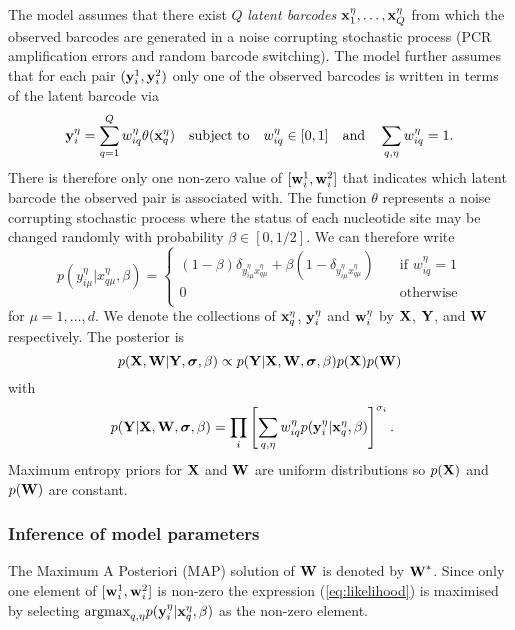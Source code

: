 The model assumes that there exist $Q$ \emph{latent barcodes} $\boldsymbol{\mathbf{x}}_1^{\eta},\ldots,\boldsymbol{\mathbf{x}}_Q^{\eta}$ from which the observed barcodes are generated in a noise corrupting stochastic process (PCR amplification errors and random barcode switching). The model further assumes that for each pair $(\boldsymbol{\mathbf{y}}_i^1,\boldsymbol{\mathbf{y}}_i^2)$ only one of the observed barcodes is written in terms of the latent barcode via
\begin{equation}
\boldsymbol{\mathbf{y}}_i^{\eta} = \sum_{q=1}^Q w_{iq}^{\eta}\theta(\boldsymbol{\mathbf{x}}_{q}^{\eta})\quad\text{subject to}\quad w_{iq}^{\eta}\in[0,1]\quad\text{and}\quad\sum_{q,\eta} w_{iq}^{\eta} = 1.
\end{equation}
There is therefore only one non-zero value of $[\boldsymbol{\mathbf{w}}_i^1,\boldsymbol{\mathbf{w}}_i^2]$ that indicates which latent barcode the observed pair is associated with. The function $\theta$ represents a noise corrupting stochastic process where the status of each nucleotide site may be changed randomly with probability $\beta\in[0,1/2]$. We can therefore write
\begin{equation}
p(y_{i\mu}^{\eta}|x_{q\mu}^{\eta},\beta) = \left\{
\begin{array}{lr}
(1-\beta)\delta_{y_{i\mu}^{\eta}x_{q\mu}^{\eta}} + \beta (1-\delta_{y_{i\mu}^{\eta}x_{q\mu}^{\eta}})&\quad\text{if $w_{iq}^{\eta}=1$}\\
0&\quad\text{otherwise}\\
\end{array}
\right.
\end{equation}
for $\mu=1,\ldots,d$. We denote the collections of $\boldsymbol{\mathbf{x}}_{q}^{\eta}$, $\boldsymbol{\mathbf{y}}_i^{\eta}$ and $\boldsymbol{\mathbf{w}}_i^{\eta}$ by $\boldsymbol{\mathbf{X}}$, $\boldsymbol{\mathbf{Y}}$, and $\boldsymbol{\mathbf{W}}$ respectively. The posterior is
\begin{equation}
p(\boldsymbol{\mathbf{X}},\boldsymbol{\mathbf{W}}|\boldsymbol{\mathbf{Y}},\boldsymbol{\sigma},\beta) \propto p(\boldsymbol{\mathbf{Y}}|\boldsymbol{\mathbf{X}},\boldsymbol{\mathbf{W}},\boldsymbol{\sigma},\beta)p(\boldsymbol{\mathbf{X}})p(\boldsymbol{\mathbf{W}})
\end{equation}
with
\begin{align}
p(\boldsymbol{\mathbf{Y}}|\boldsymbol{\mathbf{X}},\boldsymbol{\mathbf{W}},\boldsymbol{\sigma},\beta) &=\prod_{i}\left[\sum_{q,\eta}w_{iq}^{\eta} p(\boldsymbol{\mathbf{y}}_i^{\eta}|\boldsymbol{\mathbf{x}}_q^{\eta},\beta)\right]^{\sigma_i}.
\label{eq:likelihood}
\end{align}
Maximum entropy priors for $\boldsymbol{\mathbf{X}}$ and $\boldsymbol{\mathbf{W}}$ are uniform distributions so $p(\boldsymbol{\mathbf{X}})$ and $p(\boldsymbol{\mathbf{W}})$ are constant.

\subsubsection{Inference of model parameters}

The Maximum A Posteriori (MAP) solution of $\boldsymbol{\mathbf{W}}$ is denoted by $\boldsymbol{\mathbf{W}}^*$. Since only one element of $[\boldsymbol{\mathbf{w}}_i^1,\boldsymbol{\mathbf{w}}^2_i]$ is non-zero the expression (\ref{eq:likelihood}) is maximised by selecting $\text{argmax}_{q,\eta} p(\boldsymbol{\mathbf{y}}_i^{\eta}|\boldsymbol{\mathbf{x}}_q^{\eta},\beta)$ as the non-zero element.

